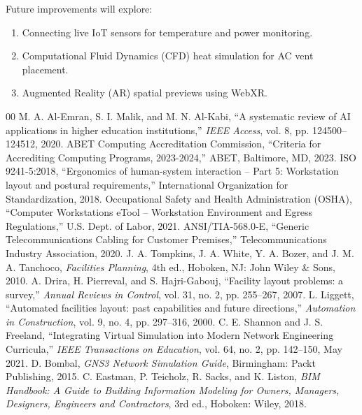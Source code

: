 \documentclass[conference]{IEEEtran}
\begin{document}
Future improvements will explore:
\begin{enumerate}
    \item Connecting live IoT sensors for temperature and power monitoring.
    \item Computational Fluid Dynamics (CFD) heat simulation for AC vent placement.
    \item Augmented Reality (AR) spatial previews using WebXR.
\end{enumerate}

\balance

\begin{thebibliography}{00}
 M. A. Al-Emran, S. I. Malik, and M. N. Al-Kabi, ``A systematic review of AI applications in higher education institutions,'' \textit{IEEE Access}, vol. 8, pp. 124500--124512, 2020.
 ABET Computing Accreditation Commission, ``Criteria for Accrediting Computing Programs, 2023-2024,'' ABET, Baltimore, MD, 2023.
 ISO 9241-5:2018, ``Ergonomics of human-system interaction -- Part 5: Workstation layout and postural requirements,'' International Organization for Standardization, 2018.
 Occupational Safety and Health Administration (OSHA), ``Computer Workstations eTool -- Workstation Environment and Egress Regulations,'' U.S. Dept. of Labor, 2021.
 ANSI/TIA-568.0-E, ``Generic Telecommunications Cabling for Customer Premises,'' Telecommunications Industry Association, 2020.
 J. A. Tompkins, J. A. White, Y. A. Bozer, and J. M. A. Tanchoco, \textit{Facilities Planning}, 4th ed., Hoboken, NJ: John Wiley \& Sons, 2010.
 A. Drira, H. Pierreval, and S. Hajri-Gabouj, ``Facility layout problems: a survey,'' \textit{Annual Reviews in Control}, vol. 31, no. 2, pp. 255--267, 2007.
 L. Liggett, ``Automated facilities layout: past capabilities and future directions,'' \textit{Automation in Construction}, vol. 9, no. 4, pp. 297--316, 2000.
 C. E. Shannon and J. S. Freeland, ``Integrating Virtual Simulation into Modern Network Engineering Curricula,'' \textit{IEEE Transactions on Education}, vol. 64, no. 2, pp. 142--150, May 2021.
 D. Bombal, \textit{GNS3 Network Simulation Guide}, Birmingham: Packt Publishing, 2015.
 C. Eastman, P. Teicholz, R. Sacks, and K. Liston, \textit{BIM Handbook: A Guide to Building Information Modeling for Owners, Managers, Designers, Engineers and Contractors}, 3rd ed., Hoboken: Wiley, 2018.

\end{thebibliography}
\end{document}
